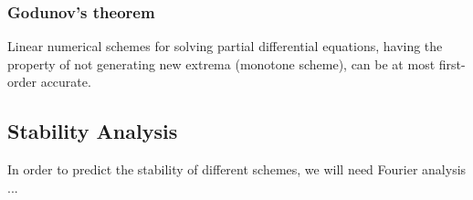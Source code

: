 \subsubsection*{Godunov's theorem}

Linear numerical schemes for solving partial differential equations,
having the property of not generating new extrema (monotone scheme),
can be at most first-order accurate.\pause


\subsection*{Stability Analysis}

In order to predict the stability of different schemes, we will need
Fourier analysis ...
